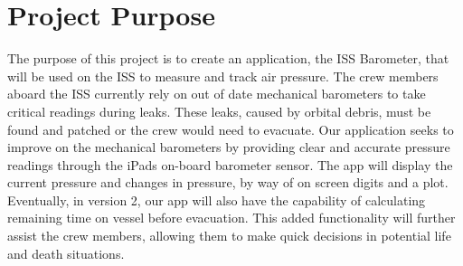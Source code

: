 \documentclass[onecolumn, draftclsnofoot,10pt, compsoc]{IEEEtran}
\def \CapstoneProjectName{ISS Barometer App }
\begin{document}
\begin{titlepage}
\begin{singlespace}
{{            }
            \vspace{20pt}
        }
        \begin{abstract}
        The International Space Station, the conglomerate work of multiple national space associations, including NASA, requires precision devices to monitor the many aspects of space life.
        One very important aspect for the success of life in near vacuum is sustained air pressure inside the modules.
        This air pressure is monitored by mechanical barometers, called Manovacometers, which must be visually monitored, and are no longer available.
        The \CapstoneProjectName seeks to provide a suitable replacement for the current barometer device aboard the International Space Station.
        This document will serve to introduce the \CapstoneProjectName, and will detail the problem, the solution, and the success metrics of the project.
        The sections include the Definition of the Problem, Definition of Project, and the Metrics of Success.
        \end{abstract}
    \end{singlespace}
\end{titlepage}
\newpage
{}
\tableofcontents
\clearpage

\section{Project Purpose}
The purpose of this project is to create an application, the ISS Barometer, that will be used on the ISS to measure and track air pressure.
The crew members aboard the ISS currently rely on out of date mechanical barometers to take critical readings during leaks.
These leaks, caused by orbital debris, must be found and patched or the crew would need to evacuate.
Our application seeks to improve on the mechanical barometers by providing clear and accurate pressure readings through the iPads on-board barometer sensor.
The app will display the current pressure and changes in pressure, by way of on screen digits and a plot.
Eventually, in version 2, our app will also have the capability of calculating remaining time on vessel before evacuation.
This added functionality will further assist the crew members, allowing them to make quick decisions in potential life and death situations.
\end{document}
